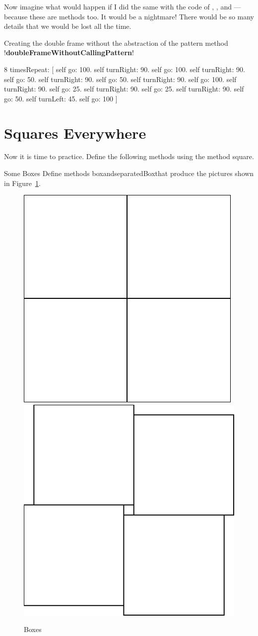 \documentclass[a4paper,10pt,twoside]{book}
\begin{document}
Now imagine what would happen if I did the same with the code of , , 
and  --- because these are methods too. It would be a nightmare! There would be so many 
details that we would be lost all the time.


\begin{method}[132]{Creating the double frame without the abstraction of the pattern method}
!\textbf{doubleFrameWithoutCallingPattern}!

8 timesRepeat: 
[ self go: 100. 
self turnRight: 90. 
self go: 100. 
self turnRight: 90. 
self go: 50. 
self turnRight: 90. 
self go: 50. 
self turnRight: 90. 
self go: 100. 
self turnRight: 90. 
self go: 25. 
self turnRight: 90. 
self go: 25. 
self turnRight: 90. 
self go: 50. 
self turnLeft: 45. 
self go: 100 ]
\end{method}




\section{Squares Everywhere} 

Now it is time to practice. Define the following methods using the method square. 

\begin{exonofigtitle}{Some Boxes}
Define methods boxandseparatedBoxthat produce the pictures shown in Figure~\ref{fig:131}. 
\end{exonofigtitle}


\begin{figure}[h]
	\centerline{\hfill\includegraphics[width=0.45\linewidth]{comp4Squares}\hfill\includegraphics[width=0.45\linewidth]{comp4SquaresTwo}\hfill}
	\caption{Boxes
	\label{fig:131}}
\end{figure}
\end{document}
